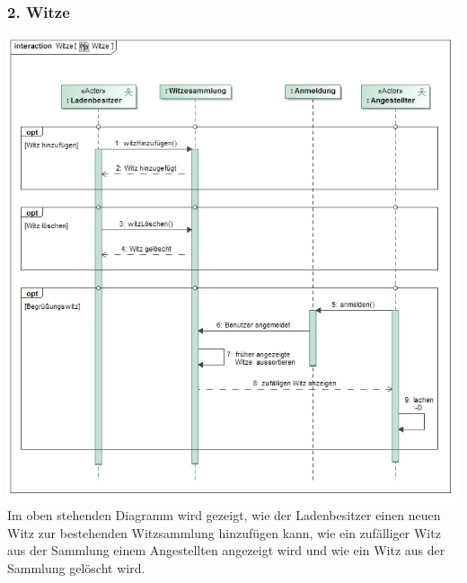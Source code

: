 \documentclass[pdftex,12pt,a4paper]{article}
\begin{document}
\subsubsection*{2. Witze}
\includegraphics[width=1\textwidth]{./images/witze}
Im oben stehenden Diagramm wird gezeigt, wie der Ladenbesitzer einen neuen Witz zur bestehenden Witzsammlung hinzufügen kann, wie ein zufälliger Witz aus der Sammlung einem Angestellten angezeigt wird und wie ein Witz aus der Sammlung gelöscht wird.
\end{document}
